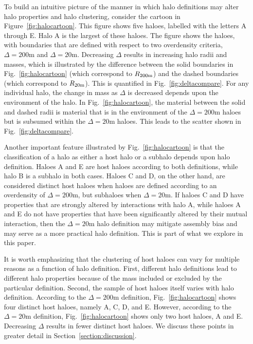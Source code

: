 \documentclass[usenatbib,fleqn]{mnras}
\begin{document}
To build an intuitive picture of the manner in which halo definitions may alter halo properties and halo clustering, consider the cartoon in Figure~\ref{fig:halocartoon}. This figure shows five haloes, labelled with the letters A through E. Halo A is the largest of these haloes. The figure shows the haloes, with boundaries that are defined with respect to two overdensity criteria, $\Delta=200$m and $\Delta=20$m. Decreasing $\Delta$ results in increasing halo radii and masses, which is illustrated by the difference between the solid boundaries in Fig.~\ref{fig:halocartoon} (which correspond to $R_{200{\rm m}}$) and the dashed boundaries (which correspond to $R_{20{\rm m}}$). This is quantified in Fig.~\ref{fig:deltacompare}. For any individual halo, the change in mass as $\Delta$ is decreased depends upon the environment of the halo. In Fig.~\ref{fig:halocartoon}, the material between the solid and dashed radii is material that is in the environment of the $\Delta=200$m haloes but is subsumed within the $\Delta=20$m haloes. This leads to the scatter shown in Fig.~\ref{fig:deltacompare}. 

Another important feature illustrated by Fig.~\ref{fig:halocartoon} is that the classification of a halo as either a host halo or a subhalo depends upon halo definition. Haloes A and E are host haloes according to both definitions, while halo B is a subhalo in
both cases. Haloes C and D, on the other hand, are considered distinct host haloes when haloes are defined according to an overdensity of $\Delta=200$m, but subhaloes when $\Delta=20$m. If haloes C and D have properties that are strongly altered by interactions with halo A, while haloes A and E do not have properties that have been significantly altered by their mutual interaction, then the $\Delta=20$m halo definition may mitigate assembly bias and may serve as a more practical halo definition. This is part of what we explore in this paper.

It is worth emphasizing that the clustering of host haloes can vary for multiple reasons as a function of halo definition. First, different halo definitions lead to different halo properties because of the mass included or excluded by the particular definition. Second, the sample of host haloes itself varies with halo definition. According to the $\Delta=200$m definition, Fig.~\ref{fig:halocartoon} shows four distinct host haloes, namely A, C, D, and E. However, according to the $\Delta=20$m definition, Fig.~\ref{fig:halocartoon} shows only two host haloes, A and E. Decreasing $\Delta$ results in fewer distinct host haloes. We discuss these points in greater detail in Section~\ref{section:discussion}.
\end{document}

